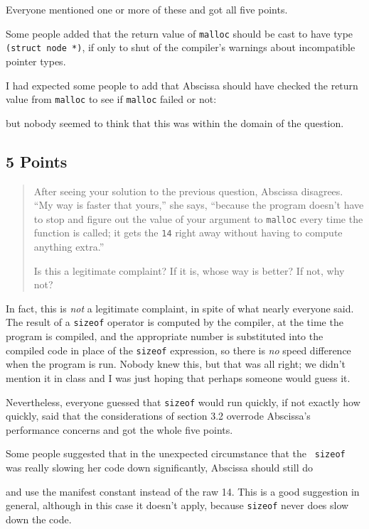 Everyone mentioned one or more of these and got all five points.

Some people added that the return value of {\tt malloc} should be cast
to have type {\tt (struct node *)}, if only to shut of the compiler's
warnings about incompatible pointer types.  

I had expected some people to add that Abscissa should have checked the
return value from {\tt malloc} to see if {\tt malloc} failed or not:

\begin{flushleft}
\verb% if ((newnode = malloc(sizeof(struct node))) == NULL) { ... %
\end{flushleft}

\noindent but nobody seemed to think that this was within the domain of
the question.

\subsection{5 Points}

\begin{quotation}
\small
    After seeing your solution to the previous question, Abscissa
disagrees.  ``My way is faster that yours,'' she says, ``because the
program doesn't have to stop and figure out the value of your argument
to {\tt malloc} every time the function is called; it gets the {\tt 14}
right away without having to compute anything extra.''

    Is this a legitimate complaint?  If it is, whose way is better?  If
not, why not?
\end{quotation}

In fact, this is {\em not}\/ a legitimate complaint, in spite of what
nearly everyone said.  The result of a {\tt sizeof} operator is computed
by the compiler, at the time the program is compiled, and the
appropriate number is substituted into the compiled code in place of the
{\tt sizeof} expression, so there is {\em no}\/ speed difference when
the program is run.  Nobody knew this, but that was all right; we didn't
mention it in class and I was just hoping that perhaps someone would
guess it.

Nevertheless, everyone guessed that {\tt sizeof} would run quickly, if
not exactly how quickly, said that the considerations of section 3.2
overrode Abscissa's performance concerns and got the whole five points.

Some people suggested that in the unexpected circumstance that the {\tt
sizeof} was really slowing her code down significantly, Abscissa should
still do

\begin{flushleft}
\verb%  #define SIZEOF_STRUCT_NODE 14 %
\end{flushleft}

\noindent and use the manifest constant instead of the raw 14.  This is
a good suggestion in general, although in this case it doesn't apply,
because {\tt sizeof} never does slow down the code.


